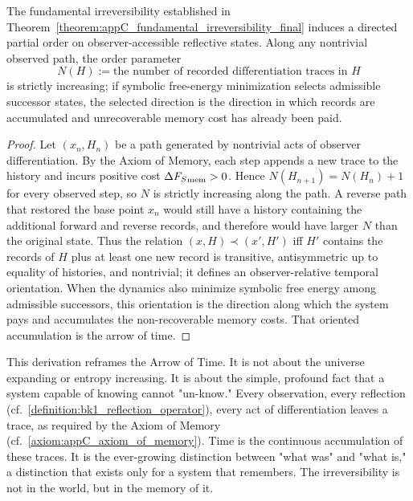 \begin{corollary}
\label{corollary:appC_emergence_of_time_arrow_final}
The fundamental irreversibility established in
Theorem~\ref{theorem:appC_fundamental_irreversibility_final} induces a directed
partial order on observer-accessible reflective states. Along any nontrivial
observed path, the order parameter
\[
N(H):=\text{the number of recorded differentiation traces in }H
\]
is strictly increasing; if symbolic free-energy minimization selects admissible
successor states, the selected direction is the direction in which records are
accumulated and unrecoverable memory cost has already been paid.
\end{corollary}

\begin{proof}
\label{proof:appC_emergence_of_time_arrow_final}
Let $(x_n,H_n)$ be a path generated by nontrivial acts of observer
differentiation. By the Axiom of Memory, each step appends a new trace to the
history and incurs positive cost $\Delta{F_S}_{\text{mem}}>0$. Hence
$N(H_{n+1})=N(H_n)+1$ for every observed step, so $N$ is strictly increasing along
the path. A reverse path that restored the base point $x_n$ would still have a
history containing the additional forward and reverse records, and therefore
would have larger $N$ than the original state. Thus the relation
$(x,H)\prec(x',H')$ iff $H'$ contains the records of $H$ plus at least one new
record is transitive, antisymmetric up to equality of histories, and nontrivial;
it defines an observer-relative temporal orientation. When the dynamics also
minimize symbolic free energy among admissible successors, this orientation is
the direction along which the system pays and accumulates the non-recoverable
memory costs. That oriented accumulation is the arrow of time.
\end{proof}

\begin{scholium}
\label{scholium:appC_time_as_memory}
This derivation reframes the Arrow of Time. It is not about the universe expanding or entropy increasing. It is about the simple, profound fact that a system capable of knowing cannot "un-know." Every observation, every reflection (cf.~\ref{definition:bk1_reflection_operator}), every act of differentiation leaves a trace, as required by the Axiom of Memory (cf.~\ref{axiom:appC_axiom_of_memory}). Time is the continuous accumulation of these traces. It is the ever-growing distinction between "what was" and "what is," a distinction that exists only for a system that remembers. The irreversibility is not in the world, but in the memory of it.
\end{scholium}

